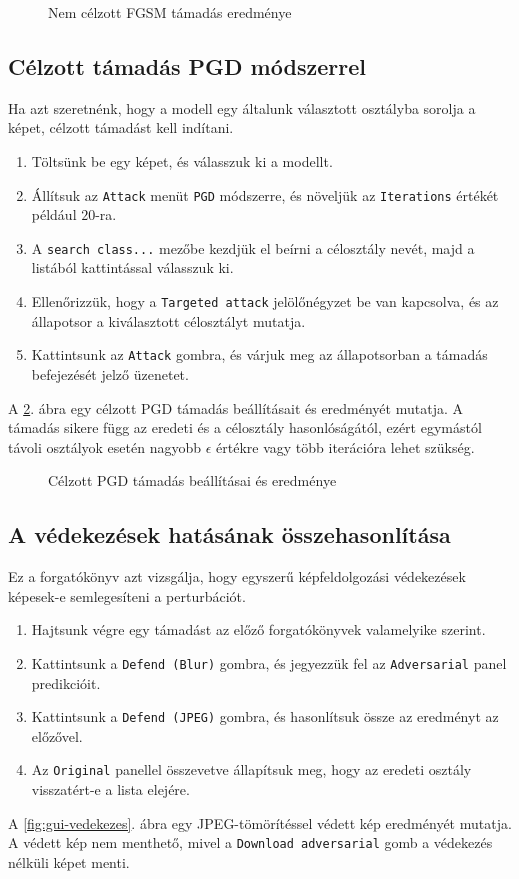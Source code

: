 \begin{figure}[htb]
\centering
{}
\caption{Nem célzott FGSM támadás eredménye}
\label{fig:gui-fgsm}
\end{figure}

\subsection{Célzott támadás PGD módszerrel}
Ha azt szeretnénk, hogy a modell egy általunk választott osztályba sorolja a képet, célzott támadást kell indítani. 
\begin{enumerate}
  \item Töltsünk be egy képet, és válasszuk ki a modellt. 
  \item Állítsuk az \texttt{Attack} menüt \texttt{PGD} módszerre, és növeljük az \texttt{Iterations} értékét például $20$-ra. 
  \item A \texttt{search class...} mezőbe kezdjük el beírni a célosztály nevét, majd a listából kattintással válasszuk ki. 
  \item Ellenőrizzük, hogy a \texttt{Targeted attack} jelölőnégyzet be van kapcsolva, és az állapotsor a kiválasztott 
        célosztályt mutatja. 
  \item Kattintsunk az \texttt{Attack} gombra, és várjuk meg az állapotsorban a támadás befejezését jelző üzenetet. 
\end{enumerate}
A \ref{fig:gui-pgd-celzott}. ábra egy célzott PGD támadás beállításait és eredményét mutatja. 
A támadás sikere függ az eredeti és a célosztály hasonlóságától, ezért egymástól távoli osztályok esetén nagyobb 
$\epsilon$ értékre vagy több iterációra lehet szükség. 

\begin{figure}[htb]
\centering
{}
\caption{Célzott PGD támadás beállításai és eredménye}
\label{fig:gui-pgd-celzott}
\end{figure}

\subsection{A védekezések hatásának összehasonlítása}
Ez a forgatókönyv azt vizsgálja, hogy egyszerű képfeldolgozási védekezések képesek-e semlegesíteni a perturbációt. 
\begin{enumerate}
  \item Hajtsunk végre egy támadást az előző forgatókönyvek valamelyike szerint. 
  \item Kattintsunk a \texttt{Defend (Blur)} gombra, és jegyezzük fel az \texttt{Adversarial} panel predikcióit. 
  \item Kattintsunk a \texttt{Defend (JPEG)} gombra, és hasonlítsuk össze az eredményt az előzővel. 
  \item Az \texttt{Original} panellel összevetve állapítsuk meg, hogy az eredeti osztály visszatért-e a lista elejére. 
\end{enumerate}
A \ref{fig:gui-vedekezes}. ábra egy JPEG-tömörítéssel védett kép eredményét mutatja. 
A védett kép nem menthető, mivel a \texttt{Download adversarial} gomb a védekezés nélküli képet menti. 

